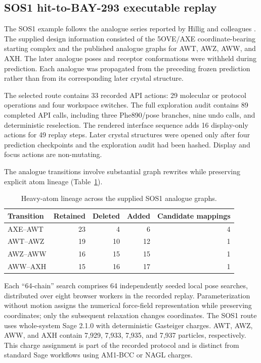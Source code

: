 \documentclass[11pt]{article}
\begin{document}
\begin{small}
\subsection{SOS1 hit-to-BAY-293 executable replay}

The SOS1 example follows the analogue series reported by Hillig and colleagues \citep{hillig2019sos1}. The supplied design information consisted of the 5OVE/AXE coordinate-bearing starting complex and the published analogue graphs for AWT, AWZ, AWW, and AXH. The later analogue poses and receptor conformations were withheld during prediction. Each analogue was propagated from the preceding frozen prediction rather than from its corresponding later crystal structure.

The selected route contains 33 recorded API actions: 29 molecular or protocol operations and four workspace switches. The full exploration audit contains 89 completed API calls, including three Phe890/pose branches, nine undo calls, and deterministic reselection. The rendered interface sequence adds 16 display-only actions for 49 replay steps. Later crystal structures were opened only after four prediction checkpoints and the exploration audit had been hashed. Display and focus actions are non-mutating.

The analogue transitions involve substantial graph rewrites while preserving explicit atom lineage (Table~\ref{tab:appA_lineage}).

\begin{table}[htbp]
\centering\small
\caption{Heavy-atom lineage across the supplied SOS1 analogue graphs.}
\label{tab:appA_lineage}
\begin{tabular}{@{}lrrrr@{}}
\toprule
\textbf{Transition} & \textbf{Retained} & \textbf{Deleted} & \textbf{Added} & \textbf{Candidate mappings}\\
\midrule
AXE--AWT & 23 & 4 & 6 & 4\\
AWT--AWZ & 19 & 10 & 12 & 1\\
AWZ--AWW & 16 & 15 & 15 & 1\\
AWW--AXH & 15 & 16 & 17 & 1\\
\bottomrule
\end{tabular}
\end{table}

Each ``64-chain'' search comprises 64 independently seeded local pose searches, distributed over eight browser workers in the recorded replay. Parameterization without motion assigns the numerical force-field representation while preserving coordinates; only the subsequent relaxation changes coordinates. The SOS1 route uses whole-system Sage 2.1.0 with deterministic Gasteiger charges. AWT, AWZ, AWW, and AXH contain 7,929, 7,933, 7,935, and 7,937 particles, respectively. This charge assignment is part of the recorded protocol and is distinct from standard Sage workflows using AM1-BCC or NAGL charges.


\end{small}
\end{document}
